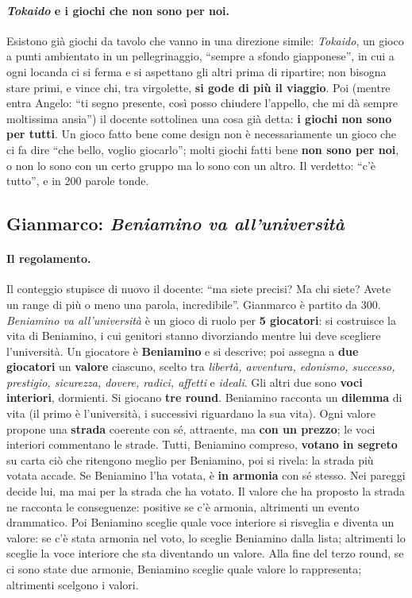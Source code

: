 \paragraph{\emph{Tokaido} e i giochi che non sono per noi.} Esistono già giochi da
tavolo che vanno in una direzione simile: \emph{Tokaido}, un gioco a punti
ambientato in un pellegrinaggio, ``sempre a sfondo giapponese'', in cui a ogni locanda
ci si ferma e si aspettano gli altri prima di ripartire; non bisogna stare primi, e
vince chi, tra virgolette, \textbf{si gode di più il viaggio}. Poi (mentre entra
Angelo: ``ti segno presente, così posso chiudere l'appello, che mi dà sempre
moltissima ansia'') il docente sottolinea una cosa già detta: \textbf{i giochi non
sono per tutti}. Un gioco fatto bene come design non è necessariamente un gioco che
ci fa dire ``che bello, voglio giocarlo''; molti giochi fatti bene \textbf{non sono
per noi}, o non lo sono con un certo gruppo ma lo sono con un altro. Il verdetto: ``c'è
tutto'', e in 200 parole tonde.

\subsection{Gianmarco: \emph{Beniamino va all'università}}
\label{a6:sec:beniamino}

\paragraph{Il regolamento.} Il conteggio stupisce di nuovo il docente: ``ma siete
precisi? Ma chi siete? Avete un range di più o meno una parola, incredibile''.
Gianmarco è partito da 300. \emph{Beniamino va all'università} è un gioco di ruolo per
\textbf{5 giocatori}: si costruisce la vita di Beniamino, i cui genitori stanno
divorziando mentre lui deve scegliere l'università. Un giocatore è
\textbf{Beniamino} e si descrive; poi assegna a \textbf{due giocatori} un
\textbf{valore} ciascuno, scelto tra \emph{libertà, avventura, edonismo, successo,
prestigio, sicurezza, dovere, radici, affetti} e \emph{ideali}. Gli altri due sono
\textbf{voci interiori}, dormienti. Si giocano \textbf{tre round}. Beniamino racconta un
\textbf{dilemma} di vita (il primo è l'università, i successivi riguardano la sua
vita). Ogni valore propone una \textbf{strada} coerente con sé, attraente, ma
\textbf{con un prezzo}; le voci interiori commentano le strade. Tutti, Beniamino
compreso, \textbf{votano in segreto} su carta ciò che ritengono meglio per Beniamino,
poi si rivela: la strada più votata accade. Se Beniamino l'ha votata, è \textbf{in
armonia} con sé stesso. Nei pareggi decide lui, ma mai per la strada che ha votato. Il
valore che ha proposto la strada ne racconta le conseguenze: positive se c'è armonia,
altrimenti un evento drammatico. Poi Beniamino sceglie quale voce interiore si
risveglia e diventa un valore: se c'è stata armonia nel voto, lo sceglie Beniamino
dalla lista; altrimenti lo sceglie la voce interiore che sta diventando un valore.
Alla fine del terzo round, se ci sono state due armonie, Beniamino sceglie quale valore
lo rappresenta; altrimenti scelgono i valori.

